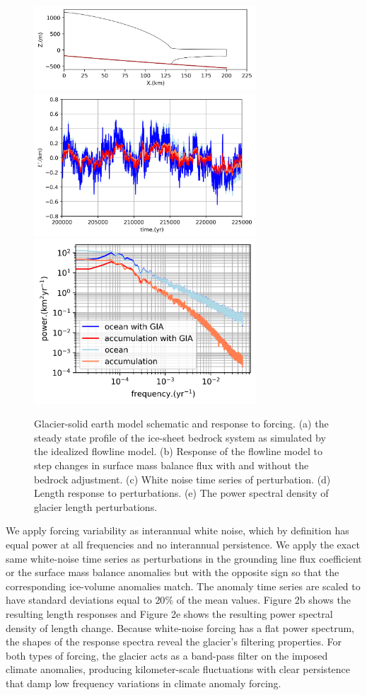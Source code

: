 \documentclass[tc, manuscript]{copernicus}
\begin{document}
\begin{figure}[t]
\includegraphics[width=8.3cm]{../figures/overview.png}
\includegraphics[width=8.3cm]{../figures/length_perturbation_timeseries.png}
\includegraphics[width=8.3cm]{../figures/power_spectra.png}
\caption{ Glacier-solid earth model schematic and response to forcing. (a) the steady state profile of the ice-sheet bedrock system as simulated by the idealized flowline model. (b) Response of the flowline model to step changes in surface mass balance flux with and without the bedrock adjustment. (c) White noise time series of perturbation. (d) Length response to perturbations. (e) The power spectral density of glacier length perturbations.}
\end{figure}



We apply forcing variability as interannual white noise, which by definition has equal power at all frequencies and no interannual persistence. We apply the exact same white-noise time series as perturbations in the grounding line flux coefficient or the surface mass balance anomalies but with the opposite sign so that the corresponding ice-volume anomalies match. The anomaly time series are scaled to have standard deviations equal to $20\%$ of the mean values. Figure 2b shows the resulting length responses and Figure 2e shows the resulting power spectral density of length change.  
Because white-noise forcing has a flat power spectrum, the shapes of the response spectra reveal the glacier's filtering properties.
For both types of forcing, the glacier acts as a band-pass filter on the imposed climate anomalies, producing kilometer-scale fluctuations with clear persistence that damp low frequency variations in climate anomaly forcing.
\end{document}
